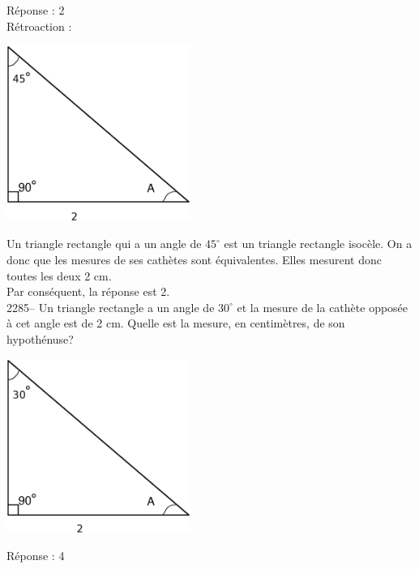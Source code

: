 \documentclass[letterpaper, 12pt]{article}
\begin{document}
R\'eponse : 2\\

R\'etroaction :\\
\begin{center}
 \includegraphics[width=6cm,bb=14 14 576 513]{Triangle_rectangle2284.eps}
\end{center}
Un triangle rectangle qui a un angle de $45^{\circ}$ est un triangle rectangle isoc\`ele. On a donc que les mesures de ses cath\`etes sont \'equivalentes. Elles mesurent donc toutes les deux 2 cm.\\
Par cons\'equent, la r\'eponse est 2.\\

2285-- Un triangle rectangle a un angle de $30^{\circ}$ et la mesure de la cath\`ete oppos\'ee \`a cet angle est de 2 cm. Quelle est la mesure, en centim\`etres, de son hypoth\'enuse? \\
\begin{center}
 \includegraphics[width=6cm,bb=14 14 569 522]{Triangle_rectangle2285.eps}
\end{center}

R\'eponse : 4\\
\end{document}
